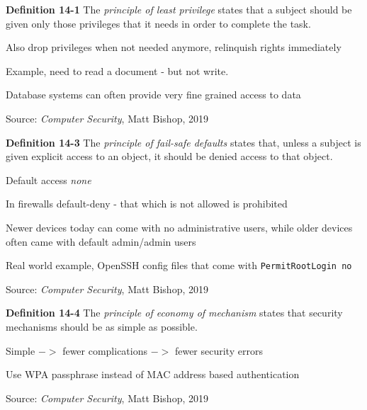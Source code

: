 \documentclass[Screen16to9,17pt]{foils}
\begin{document}

\begin{list1}
\item {\bf Definition 14-1} The \emph{principle of least privilege} states that a subject should be given only those privileges that it needs in order to complete the task.
\item Also drop privileges when not needed anymore, relinquish rights immediately
\item Example, need to read a document - but not write.
\item Database systems can often provide very fine grained access to data
\end{list1}

{\footnotesize Source: \emph{Computer Security}, Matt Bishop, 2019}



\begin{list1}
\item {\bf Definition 14-3} The \emph{principle of fail-safe defaults} states that, unless a subject is given explicit access to an object, it should be denied access to that object.
\item Default access \emph{none}
\item In firewalls default-deny - that which is not allowed is prohibited
\item Newer devices today can come with no administrative users, while older devices often came with default admin/admin users
\item Real world example, OpenSSH config files that come with \verb+PermitRootLogin no+
\end{list1}

{\footnotesize Source: \emph{Computer Security}, Matt Bishop, 2019}



\begin{list1}
\item {\bf Definition 14-4} The \emph{principle of economy of mechanism} states that security mechanisms should be as simple as possible.
\item Simple $->$ fewer complications $->$ fewer security errors
\item Use WPA passphrase instead of MAC address based authentication
\item
\end{list1}

{\footnotesize Source: \emph{Computer Security}, Matt Bishop, 2019}
\end{document}
